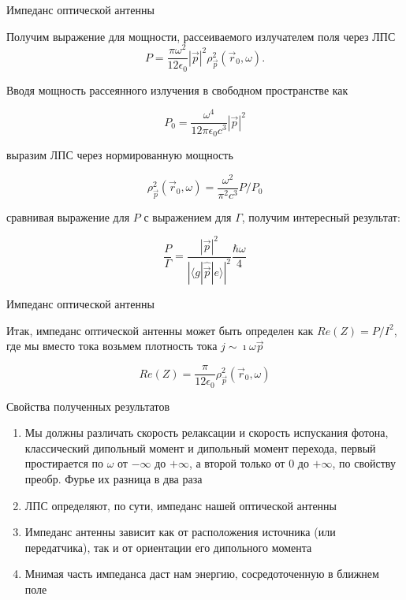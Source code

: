 \documentclass[9pt, compress, xcolor=table]{beamer}
\begin{document}
\begin{frame}{Импеданс оптической антенны}

Получим выражение для мощности, рассеиваемого излучателем поля через ЛПС
\begin{equation*}
P =\frac{\pi \omega^2}{12 \epsilon_0}|\vec p|^2 \rho_{\vec p}^2(\vec r_0, \omega).
\end{equation*}

Вводя мощность рассеянного излучения в свободном пространстве как

\begin{equation*}
P_0 =\frac{\omega^4}{12 \pi \epsilon_0 c^3}|\vec p|^2
\end{equation*}

выразим ЛПС через нормированную мощность

\begin{equation*}
\rho_{\vec p}^2(\vec r_0, \omega) =\frac{\omega^2}{\pi^2 c^3}P/P_0
\end{equation*}

сравнивая выражение для $P$ с выражением для $\Gamma$, получим интересный результат:

\begin{equation*} \frac{P}{\Gamma} = \frac{|\vec p|^2}{\left|\langle g| \hat{\vec p}| e
\rangle\right|^2}\frac{\hbar \omega}{4}
\end{equation*}
\end{frame}


\begin{frame}{Импеданс оптической антенны}

Итак, импеданс оптической антенны может быть определен как $Re(Z)=P/I^2$, где мы
вместо тока возьмем плотность тока $j \sim \imath \omega \vec p$

\begin{equation*}
Re(Z) = \frac{\pi}{12 \epsilon_0}\rho_{\vec p}^2(\vec r_0, \omega)
\end{equation*}

{\textcolor{red!50!black}{Свойства полученных результатов}}
\begin{enumerate}
\item Мы должны различать скорость релаксации и скорость испускания фотона,
    классический дипольный момент и дипольный момент перехода, первый простирается по $\omega$ от $-\infty$ до $+\infty$, а второй только от $0$ до $+\infty$, по свойству преобр. Фурье их разница в два раза

\item ЛПС определяют, по сути, импеданс нашей оптической антенны

\item  Импеданс антенны зависит как от расположения источника (или передатчика),
    так и от ориентации его дипольного момента

\item Мнимая часть импеданса даст нам энергию, сосредоточенную в ближнем поле
\end{enumerate}


\end{frame}
\end{document}
